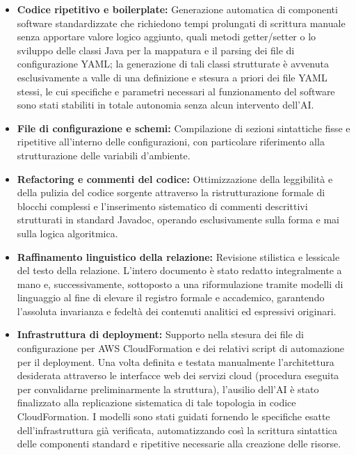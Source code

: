 \documentclass[conference]{IEEEtran}
\begin{document}
\begin{itemize}
    \item \textbf{Codice ripetitivo e boilerplate:} Generazione automatica di componenti software standardizzate che richiedono tempi prolungati di scrittura manuale senza apportare valore logico aggiunto, quali metodi getter/setter o lo sviluppo delle classi Java per la mappatura e il parsing dei file di configurazione YAML; la generazione di tali classi strutturate è avvenuta esclusivamente a valle di una definizione e stesura a priori dei file YAML stessi, le cui specifiche e parametri necessari al funzionamento del software sono stati stabiliti in totale autonomia senza alcun intervento dell'AI.
    \item \textbf{File di configurazione e schemi:} Compilazione di sezioni sintattiche fisse e ripetitive all'interno delle configurazioni, con particolare riferimento alla strutturazione delle variabili d'ambiente.
    \item \textbf{Refactoring e commenti del codice:} Ottimizzazione della leggibilità e della pulizia del codice sorgente attraverso la ristrutturazione formale di blocchi complessi e l'inserimento sistematico di commenti descrittivi strutturati in standard Javadoc, operando esclusivamente sulla forma e mai sulla logica algoritmica.
    \item \textbf{Raffinamento linguistico della relazione:} Revisione stilistica e lessicale del testo della relazione.
    L'intero documento è stato redatto integralmente a mano e, successivamente, sottoposto a una riformulazione tramite modelli di linguaggio al fine di elevare il registro formale e accademico, garantendo l'assoluta invarianza e fedeltà dei contenuti analitici ed espressivi originari.
    \item \textbf{Infrastruttura di deployment:} Supporto nella stesura dei file di configurazione per AWS CloudFormation e dei relativi script di automazione per il deployment.
    Una volta definita e testata manualmente l'architettura desiderata attraverso le interfacce web dei servizi cloud (procedura eseguita per convalidarne preliminarmente la struttura), l'ausilio dell'AI è stato finalizzato alla replicazione sistematica di tale topologia in codice CloudFormation.
    I modelli sono stati guidati fornendo le specifiche esatte dell'infrastruttura già verificata, automatizzando così la scrittura sintattica delle componenti standard e ripetitive necessarie alla creazione delle risorse.
\end{itemize}
\end{document}
